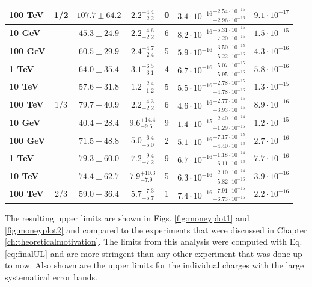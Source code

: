 \begin{table}[]
{\begin{tabular}{|l |c|c|c|c|c|c|}
\textbf{100 TeV} & \multirow{-5}{*}{1/2} & $107.7 \pm 64.2$ & $2.2^{+4.4}_{-2.2}$ & 0 & ${3.4 \cdot 10^{-16}} ^{+2.54 \cdot 10^{-15}} _{-2.96 \cdot 10^{-16}}$ & $9.1 \cdot 10^{-17}$ \\ \hline
\textbf{10 GeV} &  & $45.3 \pm 24.9$ & $2.2^{+4.6}_{-2.2}$ & 6 & ${8.2 \cdot 10^{-16}} ^{+5.31 \cdot 10^{-15}} _{-7.20 \cdot 10^{-16}}$ & $1.5 \cdot 10^{-15}$ \\ \cline{3-7}
\textbf{100 GeV} &  & $60.5 \pm 29.9$ & $2.4^{+4.7}_{-2.4}$ & 5 & ${5.9 \cdot 10^{-16}} ^{+3.50 \cdot 10^{-15}} _{-5.22 \cdot 10^{-16}}$ & $4.3 \cdot 10^{-16}$ \\ \cline{3-7}
\textbf{1 TeV} &  & $64.0 \pm 35.4$ & $3.1^{+6.5}_{-3.1}$ & 4 & ${6.7 \cdot 10^{-16}} ^{+5.07 \cdot 10^{-15}} _{-5.95 \cdot 10^{-16}}$ & $5.8 \cdot 10^{-16}$ \\ \cline{3-7}
\textbf{10 TeV} &  & $57.6 \pm 31.8$ & $1.2^{+2.4}_{-1.2}$ & 5 & ${5.5 \cdot 10^{-16}} ^{+2.78 \cdot 10^{-15}} _{-4.78 \cdot 10^{-16}}$ & $1.3 \cdot 10^{-15}$ \\ \cline{3-7}
\textbf{100 TeV }& \multirow{-5}{*}{1/3} & $79.7 \pm 40.9$ & $2.2^{+4.3}_{-2.2}$ & 6 & ${4.6 \cdot 10^{-16}} ^{+2.77 \cdot 10^{-15}} _{-3.93 \cdot 10^{-16}}$ & $8.9 \cdot 10^{-16}$ \\ \hline
\textbf{10 GeV} &  & $40.4 \pm 28.4$ & $9.6^{+14.4}_{-9.6}$ & 9 & ${1.4 \cdot 10^{-15}} ^{+2.40 \cdot 10^{-14}} _{-1.29 \cdot 10^{-16}}$ & $1.2 \cdot 10^{-15}$ \\ \cline{3-7}
\textbf{100 GeV} &  & $71.5 \pm 48.8$ & $5.0^{+6.4}_{-5.0}$ & 2 & ${5.1 \cdot 10^{-16}} ^{+7.17 \cdot 10^{-15}} _{-4.40 \cdot 10^{-16}}$ & $2.7 \cdot 10^{-16}$ \\ \cline{3-7}
\textbf{1 TeV} &  & $79.3 \pm 60.0$ & $7.2^{+9.4}_{-7.2}$ & 9 & ${6.7 \cdot 10^{-16}} ^{+1.18\cdot 10^{-14}} _{-6.11 \cdot 10^{-16}}$ & $7.7 \cdot 10^{-16}$ \\ \cline{3-7}
\textbf{10 TeV} &  & $74.4 \pm 62.7$ & $7.9^{+10.3}_{-7.9}$ & 5 & ${6.3 \cdot 10^{-16}} ^{+2.10 \cdot 10^{-14}} _{-5.82 \cdot 10^{-16}}$ & $3.9 \cdot 10^{-16}$ \\ \cline{3-7}
\textbf{100 TeV} & \multirow{-5}{*}{2/3} & $59.0 \pm 36.4$ & $5.7^{+7.3}_{-5.7}$ & 1 & ${7.4 \cdot 10^{-16}} ^{+7.91 \cdot 10^{-15}} _{-6.73 \cdot 10^{-16}}$ & $2.2 \cdot 10^{-16}$ \\ \hline
\end{tabular}%
}
\end{table}

\noindent The resulting upper limits are shown in Figs. \ref{fig:moneyplot1} and \ref{fig:moneyplot2} and compared to the experiments that were discussed in Chapter \ref{ch:theoreticalmotivation}. The limits from this analysis were computed with Eq. \ref{eq:finalUL} and are more stringent than any other experiment that was done up to now. Also shown are the upper limits for the individual charges with the large systematical error bands.

